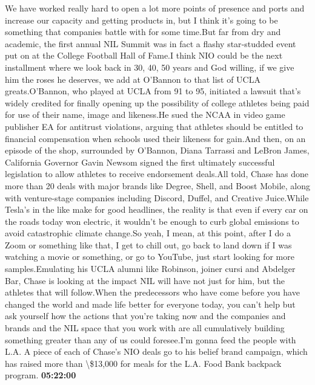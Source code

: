 \documentclass{article}%
\begin{document}
We have worked really hard to open a lot more points of presence and ports and increase our capacity and getting products in, but I think it's going to be something that companies battle with for some time.But far from dry and academic, the first annual NIL Summit was in fact a flashy star{-}studded event put on at the College Football Hall of Fame.I think NIO could be the next installment where we look back in 30, 40, 50 years and God willing, if we give him the roses he deserves, we add at O'Bannon to that list of UCLA greats.O'Bannon, who played at UCLA from 91 to 95, initiated a lawsuit that's widely credited for finally opening up the possibility of college athletes being paid for use of their name, image and likeness.He sued the NCAA in video game publisher EA for antitrust violations, arguing that athletes should be entitled to financial compensation when schools used their likeness for gain.And then, on an episode of the shop, surrounded by O'Bannon, Diana Tarrassi and LeBron James, California Governor Gavin Newsom signed the first ultimately successful legislation to allow athletes to receive endorsement deals.All told, Chase has done more than 20 deals with major brands like Degree, Shell, and Boost Mobile, along with venture{-}stage companies including Discord, Duffel, and Creative Juice.While Tesla's in the like make for good headlines, the reality is that even if every car on the roads today won electric, it wouldn't be enough to curb global emissions to avoid catastrophic climate change.So yeah, I mean, at this point, after I do a Zoom or something like that, I get to chill out, go back to land down if I was watching a movie or something, or go to YouTube, just start looking for more samples.Emulating his UCLA alumni like Robinson, joiner cursi and Abdelger Bar, Chase is looking at the impact NIL will have not just for him, but the athletes that will follow.When the predecessors who have come before you have changed the world and made life better for everyone today, you can't help but ask yourself how the actions that you're taking now and the companies and brands and the NIL space that you work with are all cumulatively building something greater than any of us could foresee.I'm gonna feed the people with L.A. A piece of each of Chase's NIO deals go to his belief brand campaign, which has raised more than \textbackslash{}\$13,000 for meals for the L.A. Food Bank backpack program.%
\textbf{05:22:00}%
\newline%
\end{document}
